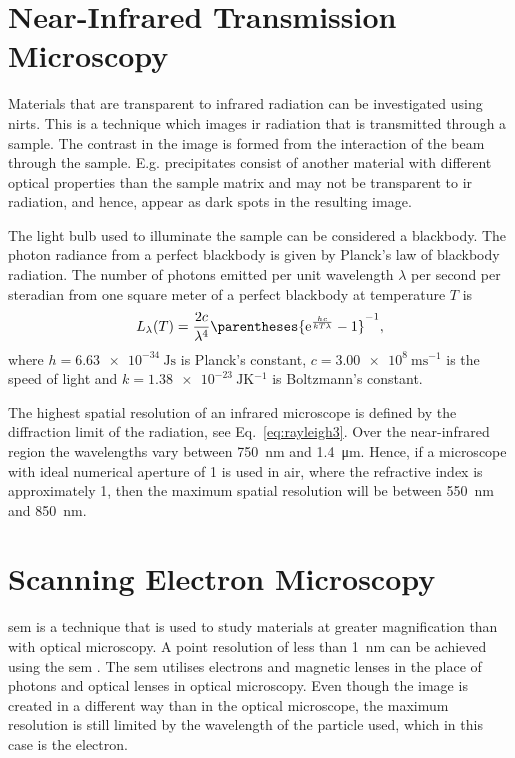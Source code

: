 \section{Near-Infrared Transmission Microscopy}
%
Materials that are transparent to infrared radiation can be investigated using \acf{nirts}. This is a technique which images \ac{ir} radiation that is transmitted through a sample. The contrast in the image is formed from the interaction of the beam through the sample. E.g. precipitates consist of another material with different optical properties than the sample matrix and may not be transparent to \ac{ir} radiation, and hence, appear as dark spots in the resulting image.

The light bulb used to illuminate the sample can be considered a blackbody. The photon radiance from a perfect blackbody is given by Planck's law of blackbody radiation. The number of photons emitted per unit wavelength $\lambda$ per second per steradian from one square meter of a perfect blackbody at temperature $T$ is \citep{liboff2003introductory}
\begin{equation}\label{eq:planck-law}
L_\lambda (T) = \frac{2c}{\lambda^4}\parentheses{\mathrm{e}^{\frac{hc}{kT\lambda}}-1}^{-1},
\end{equation}
where $h=\SI{6.63e-34}{\joule\second}$ is Planck's constant, $c=\SI{3.00e8}{\metre\second^{-1}}$ is the speed of light and $k=\SI{1.38e-23}{\joule\kelvin^{-1}}$ is Boltzmann's constant.

The highest spatial resolution of an infrared microscope is defined by the diffraction limit of the radiation, see Eq.~\eqref{eq:rayleigh3}. Over the near-infrared region the wavelengths vary between \SI{750}{\nano\metre} and \SI{1.4}{\micro\metre}. Hence, if a microscope with ideal numerical aperture of 1 is used in air, where the refractive index is approximately 1, then the maximum spatial resolution will be between \SI{550}{\nano\metre} and \SI{850}{\nano\metre}.

\section{Scanning Electron Microscopy}%
\Acf{sem} is a technique that is used to study materials at greater magnification than with optical microscopy. A point resolution of less than \SI{1}{\nano\metre} can be achieved using the \ac{sem} \citep{goldstein2012scanning}. The \ac{sem} utilises electrons and magnetic lenses in the place of photons and optical lenses in optical microscopy. Even though the image is created in a different way than in the optical microscope, the maximum resolution is still limited by the wavelength of the particle used, which in this case is the electron. 

